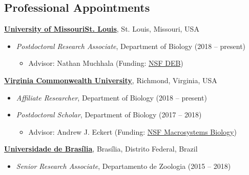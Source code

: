 \documentclass[margin,line]{res}
\begin{document}
\begin{resume}

\section{\sc Professional Appointments}
{\bf \href{http://www.umsl.edu/}{University of Missouri\textendash St. Louis}}, St. Louis, Missouri, USA\\
\vspace*{-.1in}
\begin{itemize}
\item[] \hspace*{-2mm} \textit{Postdoctoral Research Associate}, Department of Biology  (2018 -- present)
\begin{itemize}
\item Advisor: Nathan Muchhala (Funding: \href{https://www.nsf.gov/awardsearch/showAward?AWD_ID=1754802&HistoricalAwards=false}{NSF DEB})
\end{itemize}
\end{itemize}
\vspace*{-.1in}
{\bf \href{https://www.vcu.edu/}{Virginia Commonwealth University}}, Richmond, Virginia, USA\\
\vspace*{-.1in}
\begin{itemize}
\item[] \hspace*{-2mm} \textit{Affiliate Researcher}, Department of Biology  (2018 -- present)
\item[] \hspace*{-2mm} \textit{Postdoctoral Scholar}, Department of Biology  (2017 -- 2018)
\begin{itemize}
	\item Advisor: Andrew J. Eckert (Funding: \href{https://www.nsf.gov/funding/pgm_summ.jsp?pims_id=503425}{NSF Macrosystems Biology})
\end{itemize}
\end{itemize}
\vspace*{-.1in}
{\bf \href{https://www.unb.br/}{Universidade de Bras\'{i}lia}}, Bras\'{i}lia, Distrito Federal, Brazil
\begin{itemize}
	\item[] \hspace*{-2mm} \textit{Senior Research Associate}, Departamento de Zoologia  (2015 -- 2018)
\end{itemize}

\end{resume}
\end{document}
